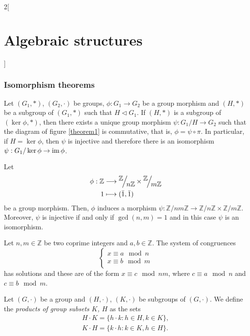 \documentclass[../../../main.tex]{subfiles}
\begin{document}
\begin{multicols}{2}[\section{Algebraic structures}]
\subsubsection*{Isomorphism theorems}
\begin{theorem}
    Let $(G_1,*)$, $(G_2,\cdot)$ be groups, $\phi:G_1\rightarrow G_2$ be a group morphism and $(H,*)$ be a subgroup of $(G_1,*)$ such that $H\lhd G_1$. If $(H,*)$ is a subgroup of $(\ker\phi,*)$, then there exists a unique group morphism $\psi:G_1/H\rightarrow G_2$ such that the diagram of figure \ref{theorem1} is commutative, that is, $\phi=\psi\circ\pi$.
    In particular, if $H=\ker\phi$, then $\psi$ is injective and therefore there is an isomorphism $\psi:G_1/\ker\phi\rightarrow\operatorname{im}\phi$.
\end{theorem}
\begin{theorem}
    Let 
    \begin{align*}
        \phi:\mathbb{Z}&\longrightarrow\quot{\mathbb{Z}}{n\mathbb{Z}}\times\quot{\mathbb{Z}}{m\mathbb{Z}}\\
        1&\longmapsto(\Bar{1},\Bar{1})
    \end{align*}
    be a group morphism. Then, $\phi$ induces a morphism $\psi:\mathbb{Z}/nm\mathbb{Z}\rightarrow\mathbb{Z}/n\mathbb{Z}\times\mathbb{Z}/m\mathbb{Z}$. Moreover, $\psi$ is injective if and only if $\gcd(n,m)=1$ and in this case $\psi$ is an isomorphism. 
\end{theorem}
\begin{corollary}
    Let $n,m\in\mathbb{Z}$ be two coprime integers and $a,b\in\mathbb{Z}$. The system of congruences $$\left\{\begin{array}{l}
        x\equiv a\mod{n}  \\
        x\equiv b\mod{m}  \\
    \end{array}\right.$$ has solutions and these are of the form $x\equiv c\mod{nm}$, where $c\equiv a\mod{n}$ and $c\equiv b\mod{m}$.
\end{corollary}
\begin{definition}
    Let $(G,\cdot)$ be a group and $(H,\cdot)$, $(K,\cdot)$ be subgroups of $(G,\cdot)$. We define the \textit{products of group subsets $K$, $H$} as the sets 
    \begin{gather*}
        H\cdot K=\{h\cdot k:h\in H,k\in K\},\\
        K\cdot H=\{k\cdot h:k\in K,h\in H\}.
    \end{gather*}

\end{definition}
\end{multicols}
\end{document}
